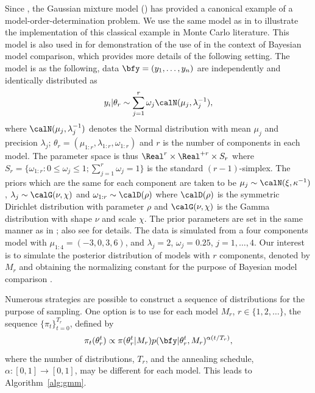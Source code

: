 \documentclass[11pt, fontset=Minion, showoverfull,
bib, mintcode, minted=cache]{marticle}
\begin{document}
Since \textcite{Richardson:1997ea}, the Gaussian mixture model (\gmm) has provided
a canonical example of a model-order-determination problem. We use the same
model as in \textcite{DelMoral:2006hc} to illustrate the implementation of this
classical example in Monte Carlo literature. This model is also used in
\textcite{Zhou2013mc} for demonstration of the use of \smc in the context of
Bayesian model comparison, which provides more details of the following
setting. The model is as the following, data $\bfy = (y_1,\dots,y_n)$ are
independently and identically distributed as
\begin{equation*}
  y_i|\theta_r \sim \sum_{j=1}^r \omega_j\calN(\mu_j,\lambda_j^{-1}),
\end{equation*}
where $\calN(\mu_j,\lambda_j^{-1})$ denotes the Normal distribution with mean
$\mu_j$ and precision $\lambda_j$; $\theta_r =
(\mu_{1:r},\lambda_{1:r},\omega_{1:r})$ and $r$ is the number of components in
each model. The parameter space is thus $\Real^r\times\Real^{+r}\times S_r$
where $S_r = \{\omega_{1:r}:0\le\omega_j\le1; \sum_{j=1}^r\omega_j=1\}$ is the
standard $(r-1)$-simplex. The priors which are the same for each component are
taken to be $\mu_j\sim\calN(\xi,\kappa^{-1})$,
$\lambda_j\sim\calG(\nu,\chi)$ and $\omega_{1:r}\sim\calD(\rho)$ where
$\calD(\rho)$ is the symmetric Dirichlet distribution with parameter $\rho$
and $\calG(\nu,\chi)$ is the Gamma distribution with shape $\nu$ and scale
$\chi$. The prior parameters are set in the same manner as in
\textcite{Richardson:1997ea}; also see \textcite{Zhou2013mc} for details. The data
is simulated from a four components model with $\mu_{1:4} = (-3, 0,3, 6)$, and
$\lambda_j =2$, $\omega_j = 0.25$, $j = 1,\dots,4$. Our interest is to
simulate the posterior distribution of models with $r$ components, denoted by
$M_r$ and obtaining the normalizing constant for the purpose of Bayesian model
comparison \textcite[chap.~7]{Robert:2007tc}.

Numerous strategies are possible to construct a sequence of distributions for
the purpose of \smc sampling. One option is to use for each model $M_r$,
$r\in\{1,2,\dots\}$, the sequence $\{\pi_t\}_{t=0}^{T_r}$, defined by
\begin{equation}
  \pi_t(\theta_r^t) \propto
  \pi(\theta_r^t|M_r)p(\bfy|\theta_r^t,M_r)^{\alpha(t/T_r)},
  \label{eq:geometry}
\end{equation}
where the number of distributions, $T_r$, and the annealing schedule,
$\alpha:[0,1]\to[0,1]$, may be different for each model. This leads to
Algorithm~\ref{alg:gmm}.
\end{document}
